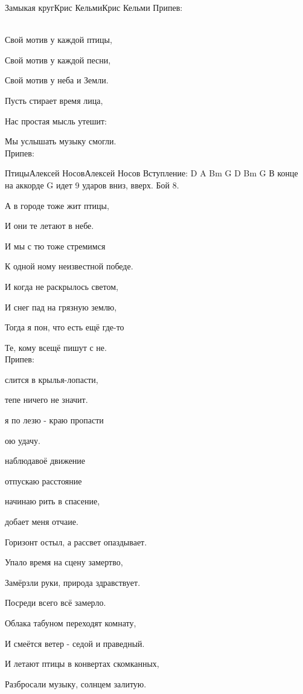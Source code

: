 \documentclass[11pt,a5paper]{book}
\renewcommand{\tt}{\indent \indent}
\begin{document}
\begin{song}{Замыкая круг}{}{Крис Кельми}{Крис Кельми}{}{}
Припев:\\\

Свой мотив у каждой птицы,\par 
Свой мотив у каждой песни,\par
Свой мотив у неба и Земли.\par
Пусть стирает время лица, \par
Нас простая мысль утешит:\par
Мы услышать музыку смогли.\\

Припев:\\
\end{song}

\begin{song}{Птицы}{}{Алексей Носов}{Алексей Носов}{}{}
Вступление: D A Bm G D Bm G 
В конце на аккорде G идет 9 ударов вниз, вверх.
Бой 8.

А в городе тоже жит птицы,\par
И они те летают в небе.\par
И мы с тю тоже стремимся\par
К одной ному неизвестной победе.\par
И когда не раскрылось светом,\par
И снег пад на грязную землю,\par 
Тогда я пон, что есть ещё где-то\par
Те, кому всещё пишут с не.\\

Припев:\par
{} слится в крылья-лопасти,\par
{} тепе ничего не значит.\par
{} я по лезю - краю пропасти\par
{} ою удачу.  \par
{} наблюдавоё движение \par
{} отпускаю  расстояние\par
{} начинаю рить в спасение,\par
{} добает меня отчаие.\\

\newpage

Горизонт остыл, а рассвет опаздывает.\par
Упало время на сцену замертво,\par
Замёрзли руки, природа здравствует.\par
Посреди всего всё замерло.\par
Облака табуном переходят комнату,\par
И смеётся ветер - седой и праведный.\par
И летают птицы в конвертах скомканных,\par
Разбросали музыку, солнцем залитую.\\


\end{song}
\end{document}
